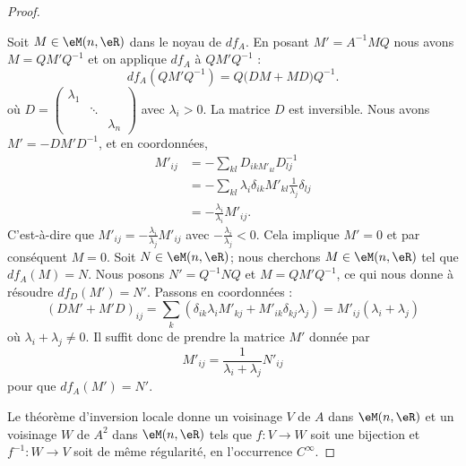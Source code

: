\begin{proof}
	\begin{subproof}
		Soit \( M\in \eM(n,\eR)\) dans le noyau de \( df_A\). En posant \( M'=A^{-1}MQ\) nous avons \( M=QM'Q^{-1}\) et on applique \( df_A\) à \( QM'Q^{-1}\) :
		\begin{equation}
			df_A(QM'Q^{-1})=Q\big( DM+MD \big)Q^{-1}.
		\end{equation}
		où \( D=\begin{pmatrix}
			\lambda_1 &        &           \\
			          & \ddots &           \\
			          &        & \lambda_n
		\end{pmatrix}\) avec \( \lambda_i>0\). La matrice \( D\) est inversible. Nous avons \( M'=-DM'D^{-1}\), et en coordonnées,
		\begin{subequations}
			\begin{align}
				M'_{ij} & = -\sum_{kl}D_{ikM'_{kl}}D^{-1}_{lj}                                    \\
				        & = -\sum_{kl}\lambda_i\delta_{ik}M'_{kl}\frac{1}{ \lambda_j }\delta_{lj} \\
				        & = -\frac{ \lambda_i }{ \lambda_i }M'_{ij}.
			\end{align}
		\end{subequations}
		C'est-à-dire que \( M'_{ij}=-\frac{ \lambda_i }{ \lambda_j }M'_{ij}\) avec \( -\frac{ \lambda_i }{ \lambda_j }<0\). Cela implique \( M'=0\) et par conséquent \( M=0\).
		Soit \( N\in \eM(n,\eR)\); nous cherchons \( M\in \eM(n,\eR)\) tel que \( df_A(M)=N\). Nous posons \( N'=Q^{-1} NQ\) et \( M=QM'Q^{-1}\), ce qui nous donne à résoudre \( df_D(M')=N'\). Passons en coordonnées :
		\begin{equation}
			(DM'+M'D)_{ij}=\sum_k(\delta_{ik}\lambda_iM'_{kj}+M'_{ik}\delta_{kj}\lambda_j)=M'_{ij}(\lambda_i+\lambda_j)
		\end{equation}
		où \( \lambda_i+\lambda_j\neq 0\). Il suffit donc de prendre la matrice \( M'\) donnée par
		\begin{equation}
			M'_{ij}=\frac{1}{ \lambda_i+\lambda_j }N'_{ij}
		\end{equation}
		pour que \( df_A(M')=N'\).
	\end{subproof}

	Le théorème d'inversion locale donne un voisinage \( V\) de \( A\) dans \( \eM(n,\eR)\) et un voisinage \( W\) de \( A^2\) dans \( \eM(n,\eR)\) tels que \( f\colon V\to W\) soit une bijection  et \( f^{-1}\colon W\to V\) soit de même régularité, en l'occurrence \( C^{\infty}\).
\end{proof}

